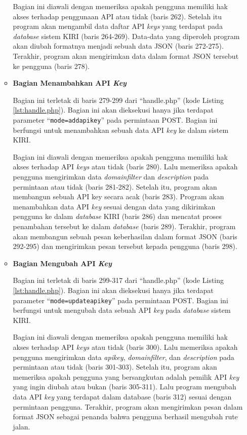 \documentclass[a4paper,twoside]{article}
\begin{document}
\begin{enumerate}
\begin{itemize}
Bagian ini diawali dengan memeriksa apakah pengguna memiliki hak akses terhadap penggunaan API atau tidak (baris 262). Setelah itu program akan mengambil data daftar API \textit{keys} yang terdapat pada \textit{database} sistem KIRI (baris 264-269). Data-data yang diperoleh program akan diubah formatnya menjadi sebuah data JSON (baris 272-275). Terakhir, program akan mengirimkan data dalam format JSON tersebut ke pengguna (baris 278).

\item \textbf{Bagian Menambahkan API \textit{Key}}

Bagian ini terletak di baris 279-299 dari ``handle.php'' (kode Listing \ref{lst:handle.php}). Bagian ini akan dieksekusi hanya jika terdapat parameter ``\texttt{mode=addapikey}'' pada permintaan POST. Bagian ini berfungsi untuk menambahkan sebuah data API \textit{key} ke dalam sistem KIRI.

Bagian ini diawali dengan memeriksa apakah pengguna memiliki hak akses terhadap API \textit{keys} atau tidak (baris 280). Lalu memeriksa apakah pengguna mengirimkan data \textit{domainfilter} dan \textit{description} pada permintaan atau tidak (baris 281-282). Setelah itu, program akan membangun sebuah API key secara acak (baris 283). Program akan menambahkan data API \textit{key} sesuai dengan data yang dikirimkan pengguna ke dalam \textit{database} KIRI (baris 286) dan mencatat proses penambahan tersebut ke dalam \textit{database} (baris 289). Terakhir, program akan membangun sebuah pesan keberhasilan dalam format JSON (baris 292-295) dan mengirimkan pesan tersebut kepada pengguna (baris 298).

\item \textbf{Bagian Mengubah API \textit{Key}}

Bagian ini terletak di baris 299-317 dari ``handle.php'' (kode Listing \ref{lst:handle.php}). Bagian ini akan dieksekusi hanya jika terdapat parameter ``\texttt{mode=updateapikey}'' pada permintaan POST. Bagian ini berfungsi untuk mengubah data sebuah API \textit{key} pada \textit{database} sistem KIRI.

Bagian ini diawali dengan memeriksa apakah pengguna memiliki hak akses terhadap API \textit{keys} atau tidak (baris 300). Lalu memeriksa apakah pengguna mengirimkan data \textit{apikey}, \textit{domainfilter}, dan \textit{description} pada permintaan atau tidak (baris 301-303). Setelah itu, program akan memeriksa apakah pengguna yang bersangkutan adalah pemilik API \textit{key} yang ingin diubah atau bukan (baris 305-311). Lalu program mengubah data API \textit{key} yang terdapat dalam database (baris 312) sesuai dengan permintaan pengguna. Terakhir, program akan mengirimkan pesan dalam format JSON sebagai penanda bahwa pengguna berhasil mengubah rute jalan.


\end{itemize}
\end{enumerate}
\end{document}
